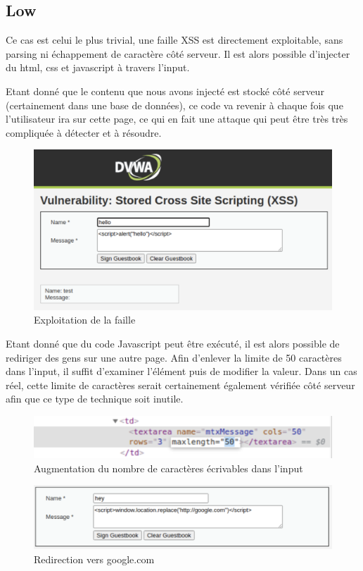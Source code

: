 \documentclass[12pt, oneside]{article}
\begin{document}
\subsection{Low}
Ce cas est celui le plus trivial, une faille XSS est directement exploitable, sans parsing ni échappement de caractère côté serveur. Il est alors possible d'injecter du html, css et javascript à travers l'input.

Etant donné que le contenu que nous avons injecté est stocké côté serveur (certainement dans une base de données), ce code va revenir à chaque fois que l'utilisateur ira sur cette page, ce qui en fait une attaque qui peut être très très compliquée à détecter et à résoudre.

\begin{figure}[H]
\centering
\includegraphics[scale=0.4]{12}
\caption{Exploitation de la faille}
\end{figure}

Etant donné que du code Javascript peut être exécuté, il est alors possible de rediriger des gens sur une autre page. Afin d'enlever la limite de 50 caractères dans l'input, il suffit d'examiner l'élément puis de modifier la valeur.
Dans un cas réel, cette limite de caractères serait certainement également vérifiée côté serveur afin que ce type de technique soit inutile.

\begin{figure}[H]
\centering
\includegraphics[scale=0.6]{13}
\caption{Augmentation du nombre de caractères écrivables dans l'input}
\end{figure}
\begin{figure}[H]
\centering
\includegraphics[scale=0.4]{14}
\caption{Redirection vers google.com}
\end{figure}
\end{document}
